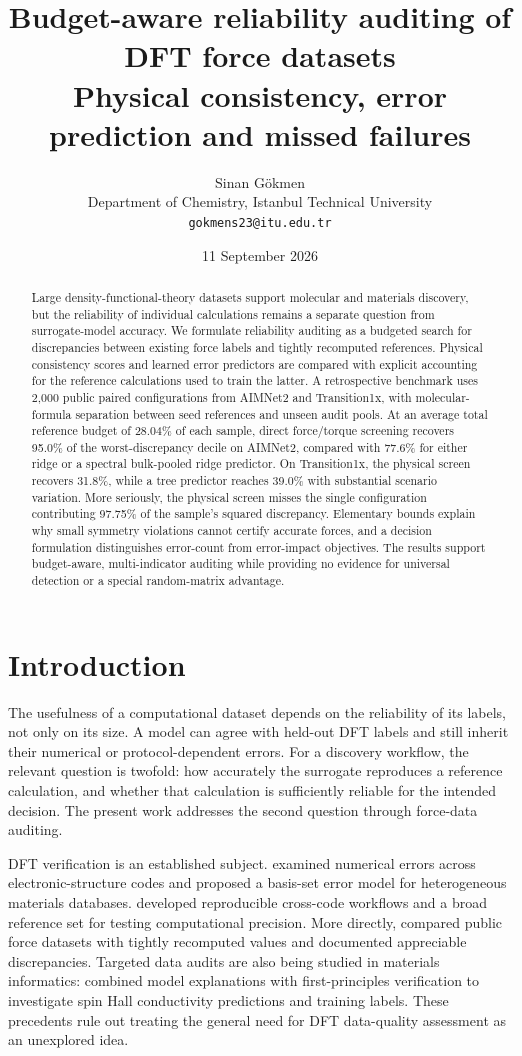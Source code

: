 \documentclass[11pt]{article}
\title{Budget-aware reliability auditing of DFT force datasets\\[3pt]
\large Physical consistency, error prediction and missed failures}
\author{Sinan G\"okmen\\Department of Chemistry, Istanbul Technical University\\
\texttt{gokmens23@itu.edu.tr}}
\date{11 September 2026}
\begin{document}
\maketitle
\begin{abstract}
Large density-functional-theory datasets support molecular and materials discovery,
but the reliability of individual calculations remains a separate question from
surrogate-model accuracy. We formulate reliability auditing as a budgeted search
for discrepancies between existing force labels and tightly recomputed references.
Physical consistency scores and learned error predictors are compared with explicit
accounting for the reference calculations used to train the latter. A retrospective
benchmark uses 2,000 public paired configurations from AIMNet2 and Transition1x,
with molecular-formula separation between seed references and unseen audit pools.
At an average total reference budget of 28.04\% of each sample, direct force/torque
screening recovers 95.0\% of the worst-discrepancy decile on AIMNet2, compared with
77.6\% for either ridge or a spectral bulk-pooled ridge predictor. On Transition1x,
the physical screen recovers 31.8\%, while a tree predictor reaches 39.0\% with
substantial scenario variation. More seriously, the physical screen misses the
single configuration contributing 97.75\% of the sample's squared discrepancy.
Elementary bounds explain why small symmetry violations cannot certify accurate
forces, and a decision formulation distinguishes error-count from error-impact
objectives. The results support budget-aware, multi-indicator auditing while
providing no evidence for universal detection or a special random-matrix advantage.
\end{abstract}

\section{Introduction}
The usefulness of a computational dataset depends on the reliability of its labels,
not only on its size. A model can agree with held-out DFT labels and still inherit
their numerical or protocol-dependent errors. For a discovery workflow, the relevant
question is twofold: how accurately the surrogate reproduces a reference calculation,
and whether that calculation is sufficiently reliable for the intended decision.
The present work addresses the second question through force-data auditing.

DFT verification is an established subject. \citet{carbogno2022} examined numerical
errors across electronic-structure codes and proposed a basis-set error model
for heterogeneous materials databases. \citet{bosoni2024} developed reproducible
cross-code workflows and a broad reference set for testing computational precision.
More directly, \citet{kuryla2025} compared public force datasets with tightly
recomputed values and documented appreciable discrepancies. Targeted data audits
are also being studied in materials informatics: \citet{mahshook2026} combined
model explanations with first-principles verification to investigate spin Hall
conductivity predictions and training labels. These precedents rule out treating
the general need for DFT data-quality assessment as an unexplored idea.
\end{document}
